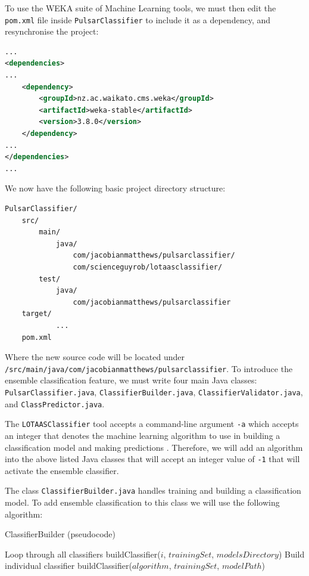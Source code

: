 \documentclass{article}
\begin{document}
To use the WEKA suite of Machine Learning tools, we must then edit the \verb|pom.xml| file inside \verb|PulsarClassifier| to include it as a dependency, and resynchronise the project:\\

\begin{lstlisting}[numbers=none, title=pom.xml, language=xml]
...
<dependencies>
...
    <dependency>
        <groupId>nz.ac.waikato.cms.weka</groupId>
        <artifactId>weka-stable</artifactId>
        <version>3.8.0</version>
    </dependency>
...
</dependencies>
...
\end{lstlisting}

We now have the following basic project directory structure:

\begin{lstlisting}[numbers=none]
PulsarClassifier/
    src/
        main/
            java/
                com/jacobianmatthews/pulsarclassifier/
                com/scienceguyrob/lotaasclassifier/
        test/
            java/
                com/jacobianmatthews/pulsarclassifier
    target/
            ...
    pom.xml
\end{lstlisting}

Where the new source code will be located under \\\verb|/src/main/java/com/jacobianmatthews/pulsarclassifier|. To introduce the ensemble classification feature, we must write four main Java classes: \\\verb|PulsarClassifier.java|,  \verb|ClassifierBuilder.java|,  \verb|ClassifierValidator.java|,  and \verb|ClassPredictor.java|.

The \verb|LOTAASClassifier| tool accepts a command-line argument \verb|-a| which accepts an integer that denotes the machine learning algorithm to use in building a classification model and making predictions \autocite{lyon}. Therefore, we will add an algorithm into the above listed Java classes that will accept an integer value of \verb|-1| that will activate the ensemble classifier.

The class \verb|ClassifierBuilder.java| handles training and building a classification model. To add ensemble classification to this class we will use the following algorithm:

\begin{algorithm}[H]
    \caption{ClassifierBuilder (pseudocode)}
    \begin{algorithmic}[1]
                \Comment Loop through all classifiers
                \State buildClassifier($i$, $trainingSet$, $modelsDirectory$)
            \EndFor
        \Else 
            \Comment Build individual classifier
            \State buildClassifier($algorithm$, $trainingSet$, $modelPath$)
            
        \EndIf
        
    \end{algorithmic}
\end{algorithm}
\end{document}
